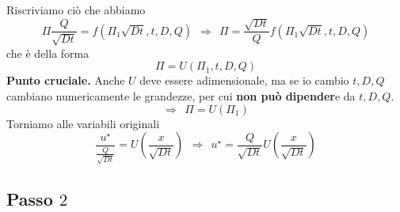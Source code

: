 \documentclass[10pt,a4paper,twoside,openright]{book}
\begin{document}
Riscriviamo ciò che abbiamo
\begin{equation*}
\Pi \frac{Q}{\sqrt{Dt}} =f\left(\Pi _{1}\sqrt{Dt},t,D,Q\right) \ \ \Rightarrow \ \ \Pi =\frac{\sqrt{Dt}}{Q} f\left(\Pi _{1}\sqrt{Dt},t,D,Q\right)
\end{equation*}
che è della forma
\begin{equation*}
\Pi =U(\Pi _{1},t,D,Q)
\end{equation*}
\textbf{Punto cruciale.} Anche $U$ deve essere adimensionale, ma se io cambio $t,D,Q$ cambiano numericamente le grandezze, per cui \textbf{non può dipender}e da $t,D,Q$.
\begin{equation*}
\Rightarrow \ \ \Pi =U(\Pi _{1})
\end{equation*}
Torniamo alle variabili originali
\begin{equation*}
\frac{u^{\star }}{\frac{Q}{\sqrt{Dt}}} =U\left(\frac{x}{\sqrt{Dt}}\right) \ \ \Rightarrow \ \ u^{\star } =\frac{Q}{\sqrt{Dt}} U\left(\frac{x}{\sqrt{Dt}}\right)
\end{equation*}
\subsection{Passo \texorpdfstring{$2$}{2}}
\end{document}
